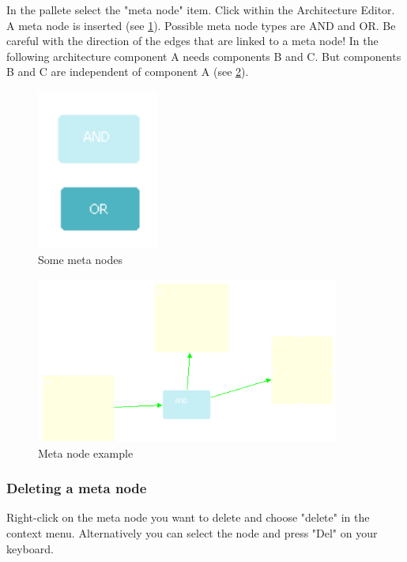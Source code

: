 In the pallete select the "meta node" item. Click within the Architecture Editor. 
A meta node is inserted (see \ref{meta}). Possible meta node types are AND and OR. Be careful with
the direction of the edges that are linked to a meta node! In the following architecture component A
needs components B and C. But components B and C are independent of component A (see \ref{example}).

\begin{figure}[h!]
\begin{center}
\includegraphics[width=4cm]{metanode.png}
   \caption{Some meta nodes}
\label{meta}
\end{center}
\end{figure}\par

\begin{figure}[h!]
\begin{center}
\includegraphics[width=10cm]{example.png}
   \caption{Meta node example}
\label{example}
\end{center}
\end{figure}\par

\subsubsection{Deleting a meta node}

Right-click on the meta node you want to delete and choose "delete" in the context
menu. Alternatively you
can select the node and press "Del" on your keyboard.

